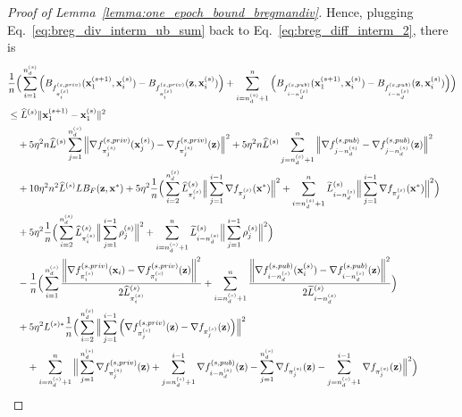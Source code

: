 \begin{proof}[Proof of Lemma~\ref{lemma:one_epoch_bound_bregmandiv}]
    Hence, plugging Eq.~\ref{eq:breg_div_interm_ub_sum} back to Eq.~\ref{eq:breg_diff_interm_2}, there is
    \begin{align}
        &\frac{1}{n} \Big(\sum_{i=1}^{n_d^{(s)}}
        \Big( B_{f_{\pi_i^{(s)}}^{(s, priv)}}({\mathbf{x}}_{1}^{(s+1)}, {\mathbf{x}}_i^{(s)})
        - B_{f_{\pi_i^{(s)}}^{(s, priv)}}({\mathbf{z}}, {\mathbf{x}}_i^{(s)}) \Big)
        + \sum_{i=n_d^{(s)}+1}^{n}\Big(
            B_{f_{i-n_d^{(s)}}^{(s,pub)}}({\mathbf{x}}_1^{(s+1)}, {\mathbf{x}}_i^{(s)})
            - B_{f_{i-n_d^{(s)}}^{(s, pub)}}({\mathbf{z}}, {\mathbf{x}}_i^{(s)})
        \Big)
        \Big) \\
        \nonumber
        &\leq \widehat{L}^{(s)} \|{\mathbf{x}}_{1}^{(s+1)} - {\mathbf{x}}_1^{(s)}\|^2 
        \\
        \nonumber
        &\quad + 5\eta^2 n \widehat{L}^{(s)} \sum_{j=1}^{n_d^{(s)}}\Big\| \nabla f_{\pi_j^{(s)}}^{(s, priv)}({\mathbf{x}}_{j}^{(s)}) - \nabla f_{\pi_j^{(s)}}^{(s, priv)}({\mathbf{z}})\Big\|^2
        + 5\eta^2 n \widehat{L}^{(s)} \sum_{j=n_d^{(s)}+1}^{n}\Big\| \nabla f_{j-n_d^{(s)}}^{(s, pub)} - \nabla f_{j-n_d^{(s)}}^{(s,pub)}({\mathbf{z}})\Big\|^2\\
        \nonumber
        &\quad + 10 \eta^2 n^2 \widehat{L}^{(s)} L B_F({\mathbf{z}}, {\mathbf{x}}^*)
        + 5 \eta^2 \frac{1}{n} \Big(\sum_{i=2}^{n_d^{(s)}}\widehat{L}_{\pi_i^{(s)}}^{(s)}\Big\| \sum_{j=1}^{i-1} \nabla f_{\pi_j^{(s)}}({\mathbf{x}}^*)\Big\|^2
        + \sum_{i=n_d^{(s)}+1}^{n}\widetilde{L}_{i-n_d^{(s)}}^{(s)}\Big\| \sum_{j=1}^{i-1}\nabla f_{\pi_j^{(s)}}({\mathbf{x}}^*)\Big\|^2 \Big)\\
        \nonumber
        &\quad 
        + 5\eta^2 \frac{1}{n} \Big( \sum_{i=2}^{n_d^{(s)}} \widehat{L}_{\pi_i^{(s)}}^{(s)} \Big\| \sum_{j=1}^{i-1} \rho_j^{(s)}\Big\|^2
        + \sum_{i=n_d^{(s)}+1}^{n} \widetilde{L}_{i-n_d^{(s)}}^{(s)}\Big\| \sum_{j=1}^{i-1} \rho_j^{(s)}\Big\|^2\Big)\\
        \nonumber
        &\quad - \frac{1}{n} \Big( 
        \sum_{i=1}^{n_d^{(s)}} \frac{ \left\|\nabla f_{\pi_i^{(s)}}^{(s, priv)}({\mathbf{x}}_i) - \nabla f_{\pi_i^{(s)}}^{(s, priv)}({\mathbf{z}}) \right\|^2}{2 \widehat{L}_{\pi_i^{(s)}}^{(s)}}
        + \sum_{i=n_d^{(s)}+1}^{n} \frac{\left\| \nabla f_{i-n_d^{(s)}}^{(s, pub)}({\mathbf{x}}_i^{(s)}) - \nabla f_{i-n_d^{(s)}}^{(s, pub)}({\mathbf{z}}) \right\|^2}{2\widetilde{L}_{i-n_d^{(s)}}^{(s)}}
        \Big)\\
        \nonumber
        &\quad + 5\eta^2 L^{(s)*} \frac{1}{n}\Big(\sum_{i=2}^{n_d^{(s)}}
        \Big\| \sum_{j=1}^{i-1} \Big( \nabla f_{\pi_j^{(s)}}^{(s, priv)}({\mathbf{z}}) - \nabla f_{\pi_j^{(s)}}({\mathbf{z}})\Big) \Big\|^2
        \\
        \nonumber
        &\quad \quad + \sum_{i=n_d^{(s)} + 1}^{n} \Big\| \sum_{j=1}^{n_d^{(s)}} \nabla f_{\pi_j^{(s)}}^{(s, priv)}({\mathbf{z}}) + \sum_{j=n_d^{(s)}+1}^{i-1} \nabla f_{i-n_d^{(s)}}^{(s, pub)}({\mathbf{z}})
            - \sum_{j=1}^{n_d^{(s)}} \nabla f_{\pi_j^{(s)}}({\mathbf{z}}) - \sum_{j=n_d^{(s)}+1}^{i-1} \nabla f_{\pi_j^{(s)}}({\mathbf{z}})
        \Big\|^2
        \Big)
    \end{align}



\end{proof}
